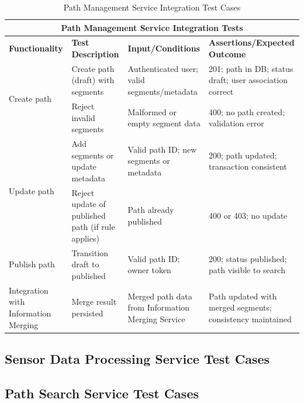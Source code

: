 \begin{table}[ht]
\centering
\begin{tabular}{|p{3.2cm}|p{3.8cm}|p{3.2cm}|p{4.8cm}|}
\hline
\multicolumn{4}{|c|}{\textbf{Path Management Service Integration Tests}} \\ 
\hline
\textbf{Functionality} & \textbf{Test Description} & \textbf{Input/Conditions} & \textbf{Assertions/Expected Outcome} \\
\hline
\multirow{2}{*}{Create path}
 & Create path (draft) with segments
 & Authenticated user; valid segments/metadata
 & 201; path in DB; status draft; user association correct \\ \cline{2-4}
 & Reject invalid segments
 & Malformed or empty segment data
 & 400; no path created; validation error \\
\hline
\multirow{2}{*}{Update path}
 & Add segments or update metadata
 & Valid path ID; new segments or metadata
 & 200; path updated; transaction consistent \\ \cline{2-4}
 & Reject update of published path (if rule applies)
 & Path already published
 & 400 or 403; no update \\
\hline
Publish path
 & Transition draft to published
 & Valid path ID; owner token
 & 200; status published; path visible to search \\
\hline
Integration with Information Merging
 & Merge result persisted
 & Merged path data from Information Merging Service
 & Path updated with merged segments; consistency maintained \\
\hline
\end{tabular}
\caption{Path Management Service Integration Test Cases}
\label{tab:test_cases_path_management}
\end{table}

\subsection{Sensor Data Processing Service Test Cases}
\label{subsec:sensor_data_processing_service_test_cases}%


\subsection{Path Search Service Test Cases}
\label{subsec:path_search_service_test_cases}%


